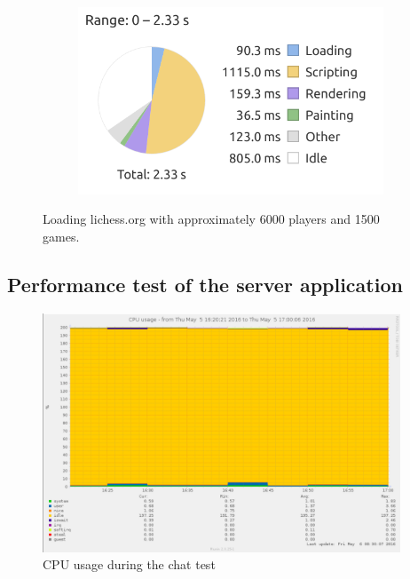 \begin{figure}[H]
\begin{subfigure}{0.5\textwidth}
        \includegraphics[width=\textwidth]{figure/clientsidePerformance/ligraph3.png}
    \end{subfigure}
    
    \caption{Loading lichess.org with approximately 6000 players and 1500 games.}
\end{figure}
\newpage

\subsection{Performance test of the server application}
\begin{figure}[H]
    \includegraphics[width=0.95\textwidth]{figure/serversidePerformance/2016-05-05-chatting-test-cpu.png}
    \caption{CPU usage during the chat test}
    \label{fig:cpu-results-attachment}
\end{figure}

